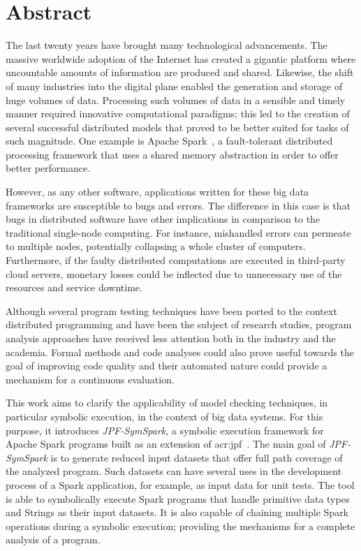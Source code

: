 \section*{Abstract}

The last twenty years have brought many technological advancements. The massive worldwide adoption of the Internet has created a gigantic platform where uncountable amounts of information are produced and shared. Likewise, the shift of many industries into the digital plane enabled the generation and storage of huge volumes of data. Processing such volumes of data in a sensible and timely manner required innovative computational paradigms; this led to the creation of several successful distributed models that proved to be better suited for tasks of such magnitude. One example is Apache Spark~\cite{Zaharia2012a}, a fault-tolerant distributed processing framework that uses a shared memory abstraction in order to offer better performance.

However, as any other software, applications written for these big data frameworks are susceptible to bugs and errors. The difference in this case is that bugs in distributed software have other implications in comparison to the traditional single-node computing. For instance, mishandled errors can permeate to multiple nodes, potentially collapsing a whole cluster of computers. Furthermore, if the faulty distributed computations are executed in third-party cloud servers, monetary losses could be inflected due to unnecessary use of the resources and service downtime.

Although several program testing techniques have been ported to the context distributed programming and have been the subject of research studies, program analysis approaches have received less attention both in the industry and the academia. Formal methods and code analyses could also prove useful towards the goal of improving code quality and their automated nature could provide a mechanism for a continuous evaluation.

This work aims to clarify the applicability of model checking techniques, in particular symbolic execution, in the context of big data systems. For this purpose, it introduces \textit{JPF-SymSpark}, a symbolic execution framework for Apache Spark programs built as an extension of \acrlong{acr:jpf}~\cite{Visser2003}. The main goal of \textit{JPF-SymSpark} is to generate reduced input datasets that offer full path coverage of the analyzed program. Such datasets can have several uses in the development process of a Spark application, for example, as input data for unit tests. The tool is able to symbolically execute Spark programs that handle primitive data types and Strings as their input datasets. It is also capable of chaining multiple Spark operations during a symbolic execution; providing the mechanisms for a complete analysis of a program.

